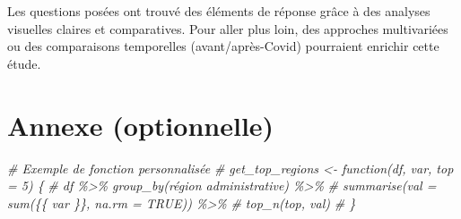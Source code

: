 \documentclass[
]{article}
\newenvironment{Shaded}{\begin{snugshade}}{\end{snugshade}}
\newcommand{\CommentTok}[1]{\textcolor[rgb]{0.56,0.35,0.01}{\textit{#1}}}
\begin{document}
Les questions posées ont trouvé des éléments de réponse grâce à des
analyses visuelles claires et comparatives. Pour aller plus loin, des
approches multivariées ou des comparaisons temporelles
(avant/après-Covid) pourraient enrichir cette étude.

\section{Annexe (optionnelle)}\label{annexe-optionnelle}

\begin{Shaded}
\begin{Highlighting}[]
\CommentTok{\# Exemple de fonction personnalisée}
\CommentTok{\# get\_top\_regions \textless{}{-} function(df, var, top = 5) \{}
\CommentTok{\#   df \%\textgreater{}\% group\_by(\textasciigrave{}région administrative\textasciigrave{}) \%\textgreater{}\%}
\CommentTok{\#     summarise(val = sum(\{\{ var \}\}, na.rm = TRUE)) \%\textgreater{}\%}
\CommentTok{\#     top\_n(top, val)}
\CommentTok{\# \}}
\end{Highlighting}
\end{Shaded}
\end{document}
